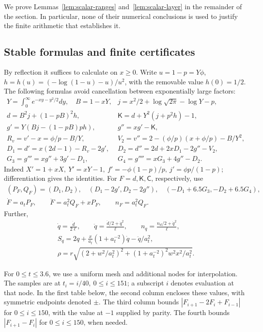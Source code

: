 We prove Lemmas~\ref{lem:scalar-ranges} and~\ref{lem:scalar-layer}
in the remainder of the section. In particular, none of their numerical
conclusions is used to justify the finite arithmetic that establishes it.

\subsection{Stable formulas and finite certificates}

By reflection it suffices to calculate on \(x\ge0\). Write \(u=1-p=Y\phi\),
\(h=h(u)=(-\log(1-u)-u)/u^2\), with the removable value \(h(0)=1/2\). The following formulas avoid cancellation between exponentially large factors:
\[
\begin{array}{ll}
 Y=\displaystyle\int_0^\infty e^{-xy-y^2/2}dy,\quad B=1-xY,& j=x^2/2+\log\sqrt{2\pi}-\log Y-p,\\
 d=B^2 j+(1-pB)^2 h,& \mathsf K=d+Y^2(j+p^2h)-1,\\
 g'=Y(Bj-(1-pB)p h),& g''=xg'-\mathsf K,\\
 R_v=v'-x=\phi/p-B/Y,& V_2=v''=2-(\phi/p)(x+\phi/p)-B/Y^2,\\
 D_1=d'=x(2d-1)-R_v-2g',&D_2=d''=2d+2xD_1-2g''-V_2,\\
 G_3=g'''=xg''+3g'-D_1,&G_4=g''''=xG_3+4g''-D_2 .
\end{array}
\]
Indeed \(X'=1+xX,\ Y'=xY-1,\ f'=-\phi(1-p)/p,\ j'=\phi p/(1-p)\); differentiation gives the identities. For \(F=d,\mathsf K,\mathsf C\), respectively, use
\[
\begin{gathered}
 (P_F,Q_F)=(D_1,D_2),\quad (D_1-2g',D_2-2g''),\quad
 (-D_1+6.5G_3,-D_2+6.5G_4),\\
 \dot F=a_t P_F,\qquad \ddot F=a_t^2 Q_F+xP_F,\qquad n_F=a_t^2 Q_F.
\end{gathered}
\]
Further,
\[
\begin{gathered}
 \dot q=\frac{\dot d}{2\ell},\qquad
 \ddot q=\frac{\ddot d/2+\dot q^2}{\ell},\qquad
 n_q=\frac{n_d/2+\dot q^2}{\ell},\\
 S_q=2q+\frac{x}{a_t}(1+a_t^{-2})\dot q-\ddot q/a_t^2,\\
 \rho=r\sqrt{(2+w^2/a_t^2)^2+(1+a_t^{-2})^2w^2x^2/a_t^2}.
\end{gathered}
\]

For \(0\le t\le3.6\), we use a uniform mesh and additional nodes for
interpolation. The samples are at \(t_i=i/40,\ 0\le i\le151\); a
subscript \(i\) denotes evaluation at that node. In the first table below,
the second column
encloses these values, with symmetric endpoints denoted \(\pm\).
The third column bounds
\(|F_{i+1}-2F_i+F_{i-1}|\) for \(0\le i\le150\), with the value
at \(-1\) supplied by parity. The fourth bounds
\(|F_{i+1}-F_i|\) for \(0\le i\le150\), when needed.


